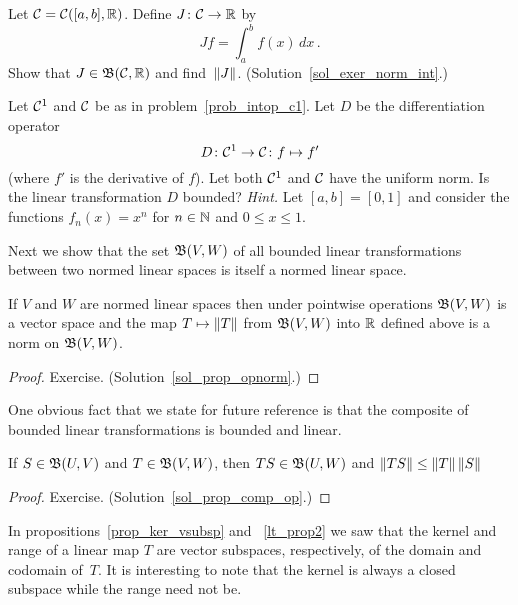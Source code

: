 \begin{exer}\label{exer_norm_int} Let $\mathcal{C} = \mathcal{C}([a,b],\mathbb{R})$.  Define $J\colon
\mathcal{C} \rightarrow \mathbb{R}$ by
  \[ Jf = \int_a^b f(x)\,dx\,. \]
Show that $J \in \mathfrak{B}(\mathcal{C},\mathbb{R})$ and find~$\lVert J\rVert$. (Solution~\ref{sol_exer_norm_int}.)
\end{exer}

\begin{prob} Let $\mathcal{C}^1$ and $\mathcal{C}$ be as in problem~\ref{prob_intop_c1}.  Let $D$ be the
differentiation operator
  \[ D \colon \mathcal{C}^1 \rightarrow \mathcal{C} \colon f \mapsto f' \]
(where $f'$ is the derivative of $f$).  Let both $\mathcal{C}^1$ and $\mathcal{C}$ have the uniform
norm.  Is the linear transformation $D$ bounded?  \emph{Hint.}  Let $[a,b] = [0,1]$ and
consider the functions $f_n(x) = x^n$ for $n \in \mathbb{N}$ and $0 \le x \le 1$.
\end{prob}

Next we show that the set $\mathfrak{B}(V,W)$ of all bounded linear transformations between two
normed linear spaces is itself a normed linear space.

\begin{prop}\label{prop_opnorm} If $V$ and $W$ are normed linear spaces then under pointwise
operations $\mathfrak{B}(V,W)$ is a vector space and the map $T \mapsto \lVert T\rVert$ from $\mathfrak{B}(V,W)$ into $\mathbb{R}$ defined above is a norm on $\mathfrak{B}(V,W)$.
\end{prop}

\begin{proof} Exercise.  (Solution~\ref{sol_prop_opnorm}.) \ns  \end{proof}

One obvious fact that we state for future reference is that the composite of bounded linear
transformations is bounded and linear.

\begin{prop}\label{prop_comp_op} If $S \in \mathfrak{B}(U,V)$ and $T \in \mathfrak{B}(V,W)$, then
$TS \in \mathfrak{B}(U,W)$ and $\lVert TS\rVert \le \lVert T\rVert \, \lVert S\rVert$
\end{prop}

\begin{proof} Exercise.  (Solution~\ref{sol_prop_comp_op}.)  \ns  \end{proof}

In propositions~\ref{prop_ker_vsubsp} and ~\ref{lt_prop2} we saw that the kernel and range of
a linear map $T$ are vector subspaces, respectively, of the domain and codomain of~$T$.  It is
interesting to note that the kernel is always a closed subspace while the range need not be.

